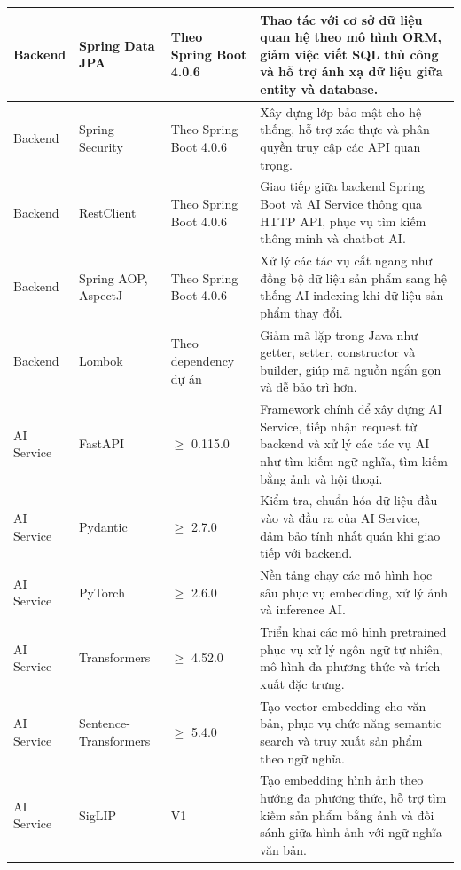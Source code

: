\begin{longtable}{|p{2.6cm}|p{3.1cm}|p{2.4cm}|p{6.3cm}|}
Backend 
& Spring Data JPA 
& Theo Spring Boot 4.0.6
& Thao tác với cơ sở dữ liệu quan hệ theo mô hình ORM, giảm việc viết SQL thủ công và hỗ trợ ánh xạ dữ liệu giữa entity và database. \\
\hline

Backend 
& Spring Security 
& Theo Spring Boot 4.0.6
& Xây dựng lớp bảo mật cho hệ thống, hỗ trợ xác thực và phân quyền truy cập các API quan trọng. \\
\hline

Backend 
& RestClient 
& Theo Spring Boot 4.0.6
& Giao tiếp giữa backend Spring Boot và AI Service thông qua HTTP API, phục vụ tìm kiếm thông minh và chatbot AI. \\
\hline

Backend 
& Spring AOP, AspectJ 
& Theo Spring Boot 4.0.6
& Xử lý các tác vụ cắt ngang như đồng bộ dữ liệu sản phẩm sang hệ thống AI indexing khi dữ liệu sản phẩm thay đổi. \\
\hline

Backend 
& Lombok 
& Theo dependency dự án
& Giảm mã lặp trong Java như getter, setter, constructor và builder, giúp mã nguồn ngắn gọn và dễ bảo trì hơn. \\
\hline

AI Service 
& FastAPI 
& $\geq$ 0.115.0
& Framework chính để xây dựng AI Service, tiếp nhận request từ backend và xử lý các tác vụ AI như tìm kiếm ngữ nghĩa, tìm kiếm bằng ảnh và hội thoại. \\
\hline

AI Service 
& Pydantic 
& $\geq$ 2.7.0
& Kiểm tra, chuẩn hóa dữ liệu đầu vào và đầu ra của AI Service, đảm bảo tính nhất quán khi giao tiếp với backend. \\
\hline

AI Service 
& PyTorch 
& $\geq$ 2.6.0
& Nền tảng chạy các mô hình học sâu phục vụ embedding, xử lý ảnh và inference AI. \\
\hline

AI Service 
& Transformers 
& $\geq$ 4.52.0
& Triển khai các mô hình pretrained phục vụ xử lý ngôn ngữ tự nhiên, mô hình đa phương thức và trích xuất đặc trưng. \\
\hline

AI Service 
& Sentence-Transformers 
& $\geq$ 5.4.0
& Tạo vector embedding cho văn bản, phục vụ chức năng semantic search và truy xuất sản phẩm theo ngữ nghĩa. \\
\hline

AI Service 
& SigLIP 
& V1
& Tạo embedding hình ảnh theo hướng đa phương thức, hỗ trợ tìm kiếm sản phẩm bằng ảnh và đối sánh giữa hình ảnh với ngữ nghĩa văn bản. \\
\hline


\end{longtable}
